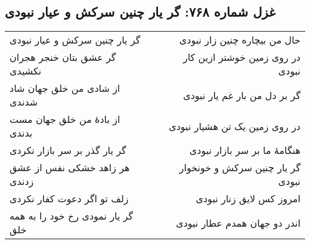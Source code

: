 \begin{center}
\section*{غزل شماره ۷۶۸: گر یار چنین سرکش و عیار نبودی}
\label{sec:768}
\begin{longtable}{l p{0.5cm} r}
گر یار چنین سرکش و عیار نبودی
&&
حال من بیچاره چنین زار نبودی
\\
گر عشق بتان خنجر هجران نکشیدی
&&
در روی زمین خوشتر ازین کار نبودی
\\
از شادی من خلق جهان شاد شدندی
&&
گر بر دل من بار غم یار نبودی
\\
از بادهٔ من خلق جهان مست بدندی
&&
در روی زمین یک تن هشیار نبودی
\\
گر یار گذر بر سر بازار نکردی
&&
هنگامهٔ ما بر سر بازار نبودی
\\
هر زاهد خشکی نفس از عشق زدندی
&&
گر یار چنین سرکش و خونخوار نبودی
\\
زلف تو اگر دعوت کفار نکردی
&&
امروز کس لایق زنار نبودی
\\
گر یار نمودی رخ خود را به همه خلق
&&
اندر دو جهان همدم عطار نبودی
\\
\end{longtable}
\end{center}
